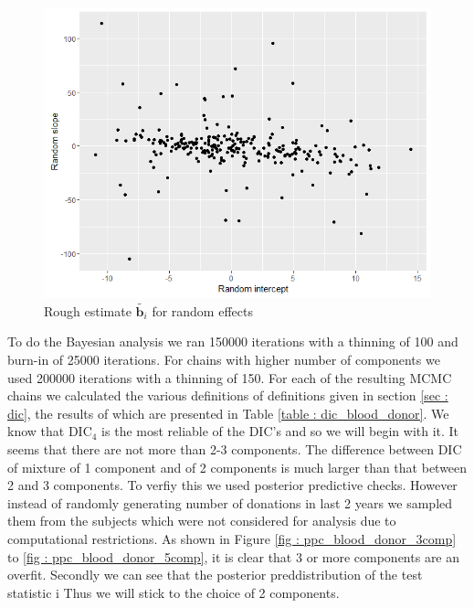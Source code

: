 \begin{figure}
	\centering
	\includegraphics[scale=0.5]{mainmatter/chapter_6_blood_donor/rough_estimate_random_effects.png}
	\caption{Rough estimate $\tilde{\boldsymbol{b}_i}$ for random effects}
	\label{fig : rough_idea_blood_donor}
\end{figure}

To do the Bayesian analysis we ran 150000 iterations with a thinning of 100 and burn-in of 25000 iterations. For chains with higher number of components we used 200000 iterations with a thinning of 150. For each of the resulting MCMC chains we calculated the various definitions of definitions given in section \ref{sec : dic}, the results of which are presented in Table \ref{table : dic_blood_donor}. We know that $\text{DIC}_4$ is the most reliable of the DIC's and so we will begin with it. It seems that there are not more than 2-3 components. The difference between DIC of mixture of 1 component and of 2 components is much larger than that between 2 and 3 components. To verfiy this we used posterior predictive checks. However instead of randomly generating number of donations in last 2 years we sampled them from the subjects which were not considered for analysis due to computational restrictions. As shown in Figure \ref{fig : ppc_blood_donor_3comp} to \ref{fig : ppc_blood_donor_5comp}, it is clear that 3 or more components are an overfit. Secondly we can see that the posterior preddistribution of the test statistic i Thus we will stick to the choice of 2 components.\\

